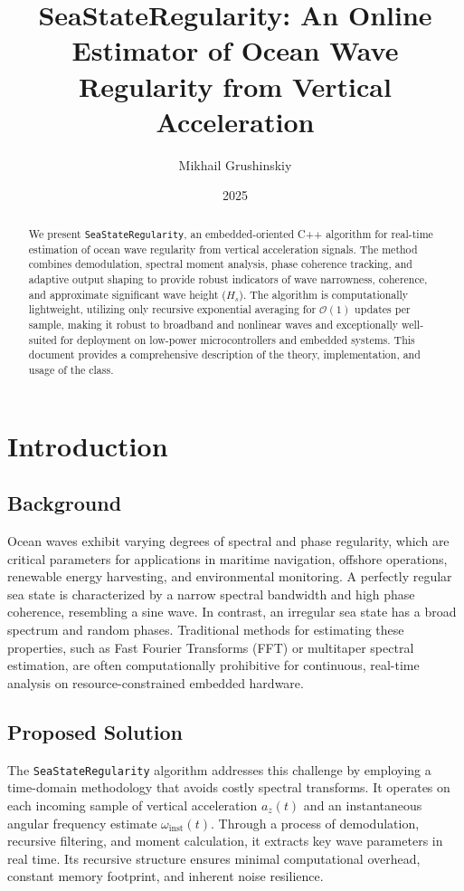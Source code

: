 \documentclass[11pt]{article}
\title{SeaStateRegularity: An Online Estimator of Ocean Wave Regularity from Vertical Acceleration}
\author{Mikhail Grushinskiy}
\date{2025}
\begin{document}
\maketitle

\begin{abstract}
We present \texttt{SeaStateRegularity}, an embedded-oriented C++ algorithm for real-time estimation of ocean wave regularity from vertical acceleration signals. The method combines demodulation, spectral moment analysis, phase coherence tracking, and adaptive output shaping to provide robust indicators of wave narrowness, coherence, and approximate significant wave height ($H_s$). The algorithm is computationally lightweight, utilizing only recursive exponential averaging for $\mathcal{O}(1)$ updates per sample, making it robust to broadband and nonlinear waves and exceptionally well-suited for deployment on low-power microcontrollers and embedded systems. This document provides a comprehensive description of the theory, implementation, and usage of the class.
\end{abstract}

\section{Introduction}
\subsection{Background}
Ocean waves exhibit varying degrees of spectral and phase regularity, which are critical parameters for applications in maritime navigation, offshore operations, renewable energy harvesting, and environmental monitoring. A perfectly regular sea state is characterized by a narrow spectral bandwidth and high phase coherence, resembling a sine wave. In contrast, an irregular sea state has a broad spectrum and random phases. Traditional methods for estimating these properties, such as Fast Fourier Transforms (FFT) or multitaper spectral estimation, are often computationally prohibitive for continuous, real-time analysis on resource-constrained embedded hardware.

\subsection{Proposed Solution}
The \texttt{SeaStateRegularity} algorithm addresses this challenge by employing a time-domain methodology that avoids costly spectral transforms. It operates on each incoming sample of vertical acceleration $a_z(t)$ and an instantaneous angular frequency estimate $\omega_{\text{inst}}(t)$. Through a process of demodulation, recursive filtering, and moment calculation, it extracts key wave parameters in real time. Its recursive structure ensures minimal computational overhead, constant memory footprint, and inherent noise resilience.
\end{document}
